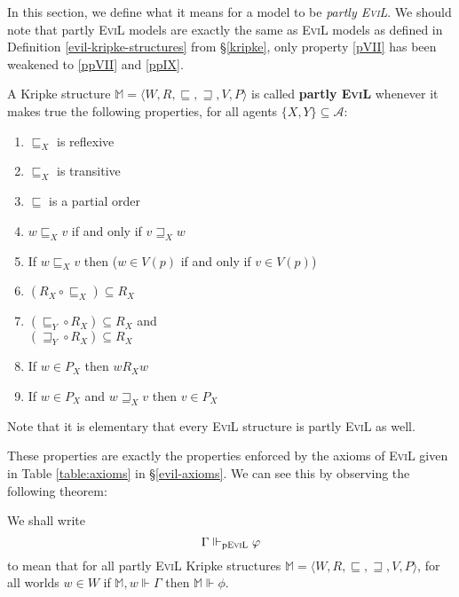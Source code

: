 In this section, we define what it means for a model to be
\emph{partly \textsc{EviL}}.  We should note that partly \textsc{EviL}
models are exactly the same as \textsc{EviL} models as defined in Definition
  \ref{evil-kripke-structures} from \S\ref{kripke}, only property
  \ref{pVII} has been weakened to \ref{ppVII} and \ref{ppIX}.

\begin{definition}\label{partly-evil}
A Kripke structure $\mathbb{M}=\langle W, R, \sqsubseteq, \sqsupseteq, V, P \rangle$ is called \textbf{partly
  \textsc{EviL}} whenever it makes true the following properties, for
all agents $\{X,Y\} \subseteq \mathcal{A}$:
  \begin{enumerate}[label=\textup{(\emph{\Roman*})$'$}, topsep=0.0in, parsep=0.075in]
    \item\label{ppI} $\sqsubseteq_X$ is reflexive
    \item \label{pptrans} $\sqsubseteq_X$ is transitive 
    \item \label{ppantisym} $\sqsubseteq$ is a partial order
    \item \label{ppreverse} $w \sqsubseteq_X v$ if and only if $v
    \sqsupseteq_X w$
    \item \label{islandiff} If $w \sqsubseteq_X v$ then ($w \in V (p)$ if and only if $v
    \in V (p)$)
    \item \label{ppV} $(R_X \circ \sqsubseteq_X) \subseteq R_X$
    \item \label{ppVI} 
    $(\sqsubseteq_Y \circ R_X) \subseteq R_X$ and \\
    $(\sqsupseteq_Y \circ R_X) \subseteq R_X$
    \item\label{ppVII} If $w \in P_X$ then $w
    R_X w$
    \item\label{ppIX} If $w \in P_X$ and $w \sqsupseteq_X v$ then $v
    \in P_X$
  \end{enumerate}
\end{definition}

Note that it is elementary that every \textsc{EviL} structure is
partly \textsc{EviL} as well.

These properties are exactly the properties enforced
by the axioms of \textsc{EviL} given in Table \ref{table:axioms} in
\S\ref{evil-axioms}. We can see this by observing the following
theorem:

\begin{definition}\label{pEviL-Vdash}
We shall write
\[ \Gamma \Vdash_{\textup{p\textsc{EviL}}} \phi \]
to mean that for all partly \textsc{EviL} Kripke structures
$\mathbb{M} = \langle W, R, \sqsubseteq, \sqsupseteq, V, P \rangle$,
for all worlds $w \in W$ if $\mathbb{M},w \Vdash \Gamma$ then $\mathbb{M} \Vdash \phi$.
\end{definition}

